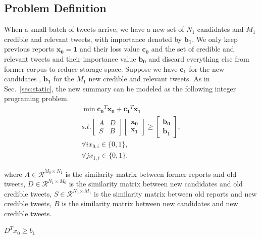 \documentclass{llncs}
\begin{document}
\subsection{Problem Definition}
When a small batch of tweets arrive, we have a new set of $N_1 $ candidates and $M_1$ credible and relevant tweets, with importance denoted by $\mathbf{b_1}$.  We only keep previous reports $\mathbf{x_0}=\mathbf{1}$ and their loss value $\mathbf{c_0}$ and the set of credible and relevant tweets and their importance value $\mathbf{b_0}$ and discard everything else from former corpus to reduce storage space. Suppose we have $\mathbf{c_1}$ for the new candidates , $\mathbf{b_1}$ for the $M_1$ new credible and relevant tweets.  As in Sec.~\ref{sec:static}, the new summary can be modeled as the following integer programing problem.  
\begin{eqnarray}
\min \mathbf{c_0}^T \mathbf{x_0}+\mathbf{c_1}^T\mathbf{x_1}\\\nonumber
s.t. \begin{bmatrix}
A & D \\
S & B
\end{bmatrix}\begin{bmatrix}
 \mathbf{x_0}\\
\mathbf{x_1}
\end{bmatrix}\geq \begin{bmatrix}
\mathbf{b_0}\\
\mathbf{b_1}
\end{bmatrix},\\\nonumber
\forall i x_{0,i}\in \{0,1\} ,\\\nonumber
\forall j x_{1,i}\in \{0,1\} ,
\end{eqnarray}

where $A\in \mathcal{R}^{M_0\times N_1}$ is the similarity matrix between former reports and old tweets, $D\in \mathcal{R}^{N_1\times M_0}$ is the similarity matrix between new candidates and old credible tweets, $S\in \mathcal{R}^{N_0\times M_1}$ is the similarity matrix between old reports and new credible tweets, $B$ is the similarity matrix between new candidates and new credible tweets.



$D^Tx_0\geq b_1$

\end{document}
